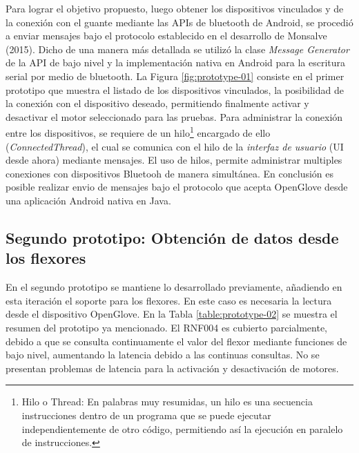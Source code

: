 Para lograr el objetivo propuesto, luego obtener los dispositivos vinculados y de la conexión con el guante mediante las APIs de bluetooth de Android, se procedió a enviar mensajes bajo el protocolo establecido en el desarrollo de Monsalve (2015). Dicho de una manera más detallada se utilizó la clase \textit{Message Generator} de la API de bajo nivel y la implementación nativa en Android para la escritura serial por medio de bluetooth. La Figura \ref{fig:prototype-01} consiste en el primer prototipo que muestra el listado de los dispositivos vinculados, la posibilidad de la conexión con el dispositivo deseado, permitiendo finalmente activar y desactivar el motor seleccionado para las pruebas. Para administrar la conexión entre los dispositivos, se requiere de un hilo\footnote{Hilo o Thread: En palabras muy resumidas, un hilo es una secuencia instrucciones dentro de un programa que se puede ejecutar independientemente de otro código, permitiendo así la ejecución en paralelo de instrucciones.} encargado de ello (\textit{ConnectedThread}), el cual se comunica con el hilo de la \textit{interfaz de usuario} (UI desde ahora)  mediante mensajes. El uso de hilos, permite administrar multiples conexiones con dispositivos Bluetooh de manera simultánea. En conclusión es posible realizar envio de mensajes bajo el protocolo que acepta OpenGlove desde una aplicación Android nativa en Java.



\subsection{Segundo prototipo: Obtención de datos desde los flexores}
\label{segundo-prototipo}
En el segundo prototipo se mantiene lo desarrollado previamente, añadiendo en esta iteración el soporte para los flexores. En este caso es necesaria la lectura desde el dispositivo OpenGlove. En la Tabla \ref{table:prototype-02} se muestra el resumen del prototipo ya mencionado. El RNF004 es cubierto parcialmente, debido a que se consulta continuamente el valor del flexor mediante funciones de bajo nivel, aumentando la latencia debido a las continuas consultas. No se presentan problemas de latencia para la activación y desactivación de motores.



